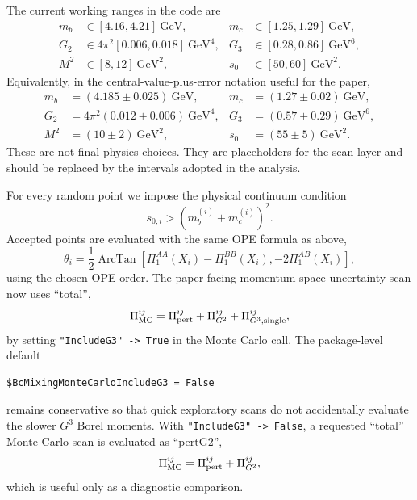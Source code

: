 \documentclass[11pt]{article}
\begin{document}
The current working ranges in the code are
\begin{align}
  m_b &\in [4.16,4.21]~\mathrm{GeV},&
  m_c &\in [1.25,1.29]~\mathrm{GeV},\\
  G_2 &\in 4\pi^2[0.006,0.018]~\mathrm{GeV}^4,&
  G_3 &\in [0.28,0.86]~\mathrm{GeV}^6,\\
  M^2 &\in [8,12]~\mathrm{GeV}^2,&
  s_0 &\in [50,60]~\mathrm{GeV}^2.
\end{align}
Equivalently, in the central-value-plus-error notation useful for the paper,
\begin{align}
  m_b &= (4.185\pm0.025)~\mathrm{GeV},&
  m_c &= (1.27\pm0.02)~\mathrm{GeV},\\
  G_2 &= 4\pi^2(0.012\pm0.006)~\mathrm{GeV}^4,&
  G_3 &= (0.57\pm0.29)~\mathrm{GeV}^6,\\
  M^2 &= (10\pm2)~\mathrm{GeV}^2,&
  s_0 &= (55\pm5)~\mathrm{GeV}^2.
\end{align}
These are not final physics choices. They are placeholders for the scan layer
and should be replaced by the intervals adopted in the analysis.

For every random point we impose the physical continuum condition
\begin{equation}
  s_{0,i} > \left(m_b^{(i)}+m_c^{(i)}\right)^2.
\end{equation}
Accepted points are evaluated with the same OPE formula as above,
\begin{equation}
  \theta_i =
  \frac{1}{2}\operatorname{ArcTan}
  \left[
    \Pi_1^{AA}(X_i)-\Pi_1^{BB}(X_i),
    -2\Pi_1^{AB}(X_i)
  \right],
\end{equation}
using the chosen OPE order.  The paper-facing momentum-space uncertainty scan
now uses ``total'',
\[
  \Pi_{\rm MC}^{ij}
  =
  \Pi_{\rm pert}^{ij}
  +
  \Pi_{G^2}^{ij}
  +
  \Pi_{G^3,\mathrm{single}}^{ij},
\]
by setting \texttt{"IncludeG3" -> True} in the Monte Carlo call.  The
package-level default
\begin{verbatim}
$BcMixingMonteCarloIncludeG3 = False
\end{verbatim}
remains conservative so that quick exploratory scans do not accidentally
evaluate the slower \(G^3\) Borel moments.  With
\texttt{"IncludeG3" -> False}, a requested
``total'' Monte Carlo scan is evaluated as ``pertG2'',
\begin{equation}
  \Pi_{\rm MC}^{ij}
  =
  \Pi_{\rm pert}^{ij}+\Pi_{G^2}^{ij},
\end{equation}
which is useful only as a diagnostic comparison.
\end{document}
